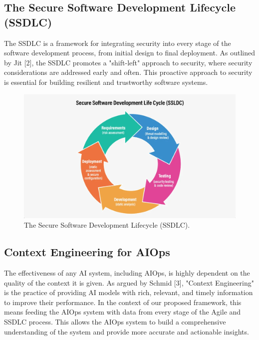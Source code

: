 \documentclass[journal]{IEEEtran}
\begin{document}
\subsection{The Secure Software Development Lifecycle (SSDLC)}
The SSDLC is a framework for integrating security into every stage of the software development process, from initial design to final deployment. As outlined by Jit [2], the SSDLC promotes a "shift-left" approach to security, where security considerations are addressed early and often. This proactive approach to security is essential for building resilient and trustworthy software systems.

\begin{figure}[h]
    \centering
    \includegraphics[width=0.8\columnwidth]{image 1.png}
    \caption{The Secure Software Development Lifecycle (SSDLC).}
    \label{fig:ssdlc}
\end{figure}

\subsection{Context Engineering for AIOps}
The effectiveness of any AI system, including AIOps, is highly dependent on the quality of the context it is given. As argued by Schmid [3], "Context Engineering" is the practice of providing AI models with rich, relevant, and timely information to improve their performance. In the context of our proposed framework, this means feeding the AIOps system with data from every stage of the Agile and SSDLC process. This allows the AIOps system to build a comprehensive understanding of the system and provide more accurate and actionable insights.
\end{document}
